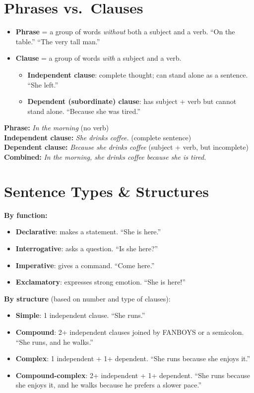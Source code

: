 \documentclass[11pt, letterpaper]{article}
\newcommand{\example}[1]{%
  \begin{tcolorbox}[colback=exbg, colframe=exborder,
    title={\bfseries Example}, arc=3pt, boxrule=1pt]
  #1
  \end{tcolorbox}%
}
\begin{document}
\section*{Phrases vs.\ Clauses}

\begin{itemize}[noitemsep]
  \item \textbf{Phrase} = a group of words \emph{without} both a subject and a verb. ``On the table.'' ``The very tall man.''
  \item \textbf{Clause} = a group of words \emph{with} a subject and a verb.
    \begin{itemize}[noitemsep]
      \item \textbf{Independent clause}: complete thought; can stand alone as a sentence. ``She left.''
      \item \textbf{Dependent (subordinate) clause}: has subject + verb but cannot stand alone. ``Because she was tired.''
    \end{itemize}
\end{itemize}

\example{
\textbf{Phrase:} \emph{In the morning} (no verb)\\
\textbf{Independent clause:} \emph{She drinks coffee.} (complete sentence)\\
\textbf{Dependent clause:} \emph{Because she drinks coffee} (subject + verb, but incomplete)\\
\textbf{Combined:} \emph{In the morning, she drinks coffee because she is tired.}
}

\section*{Sentence Types \& Structures}

\textbf{By function:}
\begin{itemize}[noitemsep]
  \item \textbf{Declarative}: makes a statement. ``She is here.''
  \item \textbf{Interrogative}: asks a question. ``Is she here?''
  \item \textbf{Imperative}: gives a command. ``Come here.''
  \item \textbf{Exclamatory}: expresses strong emotion. ``She is here!''
\end{itemize}

\textbf{By structure} (based on number and type of clauses):
\begin{itemize}[noitemsep]
  \item \textbf{Simple}: 1 independent clause. ``She runs.''
  \item \textbf{Compound}: 2+ independent clauses joined by FANBOYS or a semicolon. ``She runs, and he walks.''
  \item \textbf{Complex}: 1 independent + 1+ dependent. ``She runs because she enjoys it.''
  \item \textbf{Compound-complex}: 2+ independent + 1+ dependent. ``She runs because she enjoys it, and he walks because he prefers a slower pace.''
\end{itemize}
\end{document}
